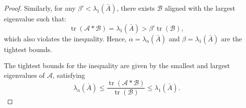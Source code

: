 \documentclass[10pt,a4paper]{amsart}
\begin{document}
\begin{proof}
    \noindent Similarly, for any $\beta' < \lambda_1(\bar{A})$, there exists $\mathcal{B}$ aligned with the largest eigenvalue such that:
    \[
    \operatorname{tr}(\mathcal{A} * \mathcal{B}) = \lambda_1(\bar{A}) > \beta' \operatorname{tr}(\mathcal{B}),
    \]
    \noindent which also violates the inequality.   Hence, $\alpha = \lambda_n(\bar{A})$ and $\beta = \lambda_1(\bar{A})$ are the tightest bounds.

    \noindent The tightest bounds for the inequality are given by the smallest and largest eigenvalues of $\mathcal{A}$, satisfying
    \[
    \lambda_n(\bar{A}) \leq \frac{\operatorname{tr}(\mathcal{A} * \mathcal{B})}{\operatorname{tr}(\mathcal{B})} \leq \lambda_1(\bar{A}).
    \]
\end{proof}
\end{document}
